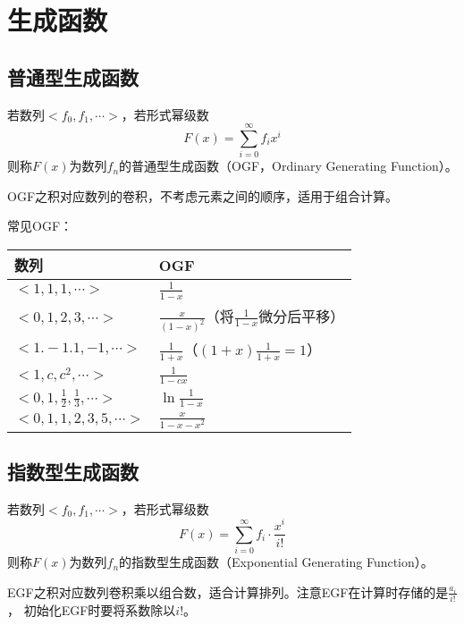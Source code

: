 \section{生成函数}\label{GF}
\subsection{普通型生成函数}
若数列$<f_0,f_1,\cdots>$，若形式幂级数
\begin{displaymath}
	F(x)=\sum_{i=0}^\infty{f_ix^i}
\end{displaymath}
则称$F(x)$为数列${f_n}$的普通型生成函数（OGF，Ordinary Generating Function）。

OGF之积对应数列的卷积，不考虑元素之间的顺序，适用于组合计算。

常见OGF：

\begin{tabular}{|l|l|}
	\hline
	数列                                   & OGF                                          \\
	\hline
	$<1,1,1,\cdots>$                       & $\frac{1}{1-x}$                              \\
	\hline
	$<0,1,2,3,\cdots>$                       & $\frac{x}{(1-x)^2}$（将$\frac{1}{1-x}$微分后平移） \\
	\hline
	$<1.-1.1,-1,\cdots>$                   & $\frac{1}{1+x}$（$(1+x)\frac{1}{1+x}=1$）    \\
	\hline
	$<1,c,c^2,\cdots>$                     & $\frac{1}{1-cx}$                             \\
	\hline
	$<0,1,\frac{1}{2},\frac{1}{3},\cdots>$ & $\ln\frac{1}{1-x}$                           \\
	\hline
	$<0,1,1,2,3,5,\cdots>$ & $\frac{x}{1-x-x^2}$\\
	\hline
\end{tabular}
\subsection{指数型生成函数}
若数列$<f_0,f_1,\cdots>$，若形式幂级数
\begin{displaymath}
	F(x)=\sum_{i=0}^\infty{f_i\cdot\frac{x^i}{i!}}
\end{displaymath}
则称$F(x)$为数列${f_n}$的指数型生成函数（Exponential Generating Function）。

EGF之积对应数列卷积乘以组合数，适合计算排列。注意EGF在计算时存储的是$\frac{a_i}{i!}$，
初始化EGF时要将系数除以$i!$。

